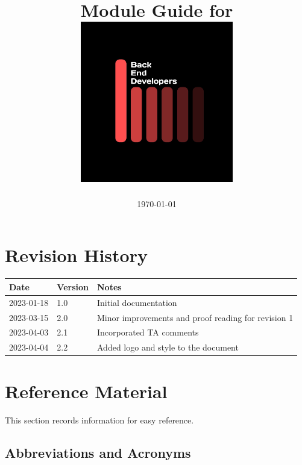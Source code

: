 \documentclass[12pt, titlepage]{article}
\begin{document}
\title{\textbf{Module Guide for \progname{}\\ \vspace{2cm} \includegraphics[width=0.5\textwidth]{../../logo.jpg}}}
 \pagecolor{black}\afterpage{\nopagecolor}
\author{\authname}
\date{\today}

\color{white}\maketitle
\color{black}

\section{Revision History}

\begin{tabularx}{\textwidth}{p{3.8cm}p{1.6cm}X}
  \toprule {\bf Date} & {\bf Version} & {\bf Notes} \\
  \midrule
2023-01-18             & 1.0           & Initial documentation     \\
  2023-03-15              & 2.0           & Minor improvements and proof reading for revision 1       \\
2023-04-03 & 2.1 & Incorporated TA comments \\
2023-04-04 & 2.2 & Added logo and style to the document \\
  \bottomrule
\end{tabularx}

\newpage

\section{Reference Material}

This section records information for easy reference.

\subsection{Abbreviations and Acronyms}
\end{document}

